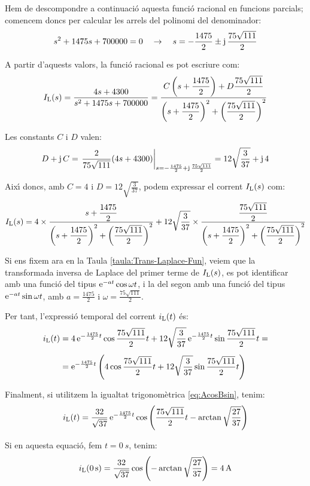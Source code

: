 \begin{exemple}
Hem de descompondre a continuaci\'{o} aquesta funci\'{o} racional en
funcions parcials; comencem doncs per calcular les arrels del
polinomi del denominador:
\[
s^2 +1475 s + 700000 = 0 \quad\rightarrow\quad s= -\frac{1475}{2}
\pm \mathrm{j}\,\frac{75\sqrt{111}}{2}
\]

A partir d'aquests valors, la  funci\'{o} racional es pot escriure com:
\[
    I_\mathrm{L}(s) =
    \frac{4 s+ 4300}{s^2 +1475 s + 700000} =
    \frac{C\left(s+\dfrac{1475}{2}\right)+D\dfrac{75\sqrt{111}}{2}}
    {\left(s+\dfrac{1475}{2}\right)^2+\left(\dfrac{75\sqrt{111}}{2}\right)^2}
\]

Les constants $C$ i $D$ valen:
\[
D + \mathrm{j}\,C = \left.\frac{2}{75\sqrt{111}}(4 s
+4300)\right|_{s=-\frac{1475}{2} + \mathrm{j}\,\frac{75\sqrt{111}}{2}}=
12\sqrt{\frac{3}{37}} +\mathrm{j}\,4
\]

Aix\'{\i} doncs, amb $C=4$ i $D=12\sqrt{\frac{3}{37}}$, podem expressar
el corrent $I_\mathrm{L}(s)$ com:
\[
    I_\mathrm{L}(s) = 4\times\frac{s+\dfrac{1475}{2}}
    {\left(s+\dfrac{1475}{2}\right)^2+\left(\dfrac{75\sqrt{111}}{2}\right)^2}
    + 12\sqrt{\frac{3}{37}}\times\frac{\dfrac{75\sqrt{111}}{2}}
    {\left(s+\dfrac{1475}{2}\right)^2+\left(\dfrac{75\sqrt{111}}{2}\right)^2}
\]


 Si ens fixem ara en la Taula \vref{taula:Trans-Laplace-Fun},
veiem que la transformada inversa de Laplace del primer terme de
$I_\mathrm{L}(s)$, es pot identificar amb una funci\'{o} del tipus
$\mathrm{e}^{-at}\cos\omega t$, i la del segon amb una funci\'{o} del tipus
$\mathrm{e}^{-at}\sin\omega t$, amb $a=\frac{1475}{2}$ i
$\omega=\frac{75\sqrt{111}}{2}$.

Per tant, l'expressi\'{o} temporal del corrent $i_\mathrm{L}(t)$ \'{e}s:
\[\begin{split}
    i_\mathrm{L}(t) &= 4\, \mathrm{e}^{-\frac{1475}{2}t} \cos \frac{75\sqrt{111}}{2} t +
    12\sqrt{\frac{3}{37}}\, \mathrm{e}^{-\frac{1475}{2}t} \sin
    \frac{75\sqrt{111}}{2}t = \\[1ex] &= \mathrm{e}^{-\frac{1475}{2}t} \left( 4
    \cos \frac{75\sqrt{111}}{2} t + 12\sqrt{\frac{3}{37}}\sin
    \frac{75\sqrt{111}}{2}t\right)
\end{split}\]

Finalment, si utilitzem la igualtat trigonom\`{e}trica
\eqref{eq:AcosBsin}, tenim:
\[
i_\mathrm{L}(t) = \frac{32}{\sqrt{37}}\,\mathrm{e}^{-\frac{1475}{2}t}
\cos\left(\frac{75\sqrt{111}}{2} t - \arctan
\sqrt{\frac{27}{37}}\right)
\]

Si en aquesta equaci\'{o}, fem $t=\SI{0}{s}$, tenim:
\[
    i_\mathrm{L}(\SI{0}{s}) = \frac{32}{\sqrt{37}} \cos\left( - \arctan
\sqrt{\frac{27}{37}}\right) = \SI{4}{A}
\]


\end{exemple}
